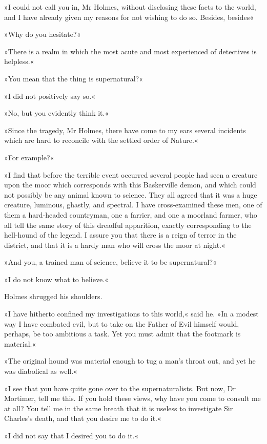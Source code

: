 »I could not call you in, Mr Holmes, without disclosing these facts to the world, and I have already given my reasons for not wishing to do so. Besides, besides\longdash «

»Why do you hesitate?«

»There is a realm in which the most acute and most experienced of detectives is helpless.«

»You mean that the thing is supernatural?«

»I did not positively say so.«

»No, but you evidently think it.«

»Since the tragedy, Mr Holmes, there have come to my ears several incidents which are hard to reconcile with the settled order of Nature.«

»For example?«

»I find that before the terrible event occurred several people had seen a creature upon the moor which corresponds with this Baskerville demon, and which could not possibly be any animal known to science. They all agreed that it was a huge creature, luminous, ghastly, and spectral. I have cross-examined these men, one of them a hard-headed countryman, one a farrier, and one a moorland farmer, who all tell the same story of this dreadful apparition, exactly corresponding to the hell-hound of the legend. I assure you that there is a reign of terror in the district, and that it is a hardy man who will cross the moor at night.«

»And you, a trained man of science, believe it to be supernatural?«

»I do not know what to believe.«

Holmes shrugged his shoulders.

»I have hitherto confined my investigations to this world,« said he. »In a modest way I have combated evil, but to take on the Father of Evil himself would, perhaps, be too ambitious a task. Yet you must admit that the footmark is material.«

»The original hound was material enough to tug a man's throat out, and yet he was diabolical as well.«

»I see that you have quite gone over to the supernaturalists. But now, Dr Mortimer, tell me this. If you hold these views, why have you come to consult me at all? You tell me in the same breath that it is useless to investigate Sir Charles's death, and that you desire me to do it.«

»I did not say that I desired you to do it.«

